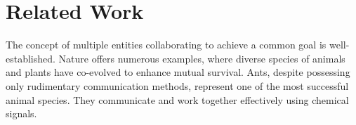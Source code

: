 \section{Related Work}

The concept of multiple entities collaborating to achieve a common goal is well-established. Nature offers numerous examples, where diverse species of animals and plants have co-evolved to enhance mutual survival.
Ants, despite possessing only rudimentary communication methods, represent one of the most successful animal species. They communicate and work together effectively using chemical signals.

